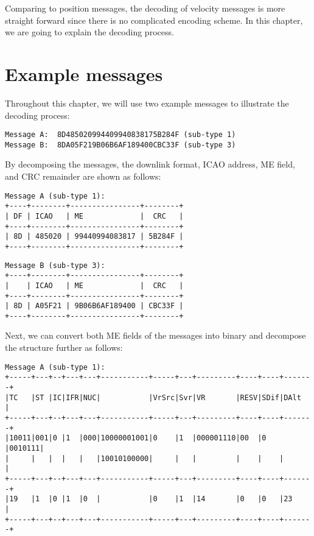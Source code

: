 Comparing to position messages, the decoding of velocity messages is more straight forward since there is no complicated encoding scheme. In this chapter, we are going to explain the decoding process.

\section{Example messages}

Throughout this chapter, we will use two example messages to illustrate the decoding process:

\begin{verbatim}
Message A:  8D485020994409940838175B284F (sub-type 1)
Message B:  8DA05F219B06B6AF189400CBC33F (sub-type 3)
\end{verbatim}

By decomposing the messages, the downlink format, ICAO address, ME field, and CRC remainder are shown as follows:

\begin{verbatim}
Message A (sub-type 1):
+----+--------+----------------+--------+
| DF | ICAO   | ME             |  CRC   |
+----+--------+----------------+--------+
| 8D | 485020 | 99440994083817 | 5B284F |
+----+--------+----------------+--------+
\end{verbatim}

\begin{verbatim}
Message B (sub-type 3):
+----+--------+----------------+--------+
|    | ICAO   | ME             |  CRC   |
+----+--------+----------------+--------+
| 8D | A05F21 | 9B06B6AF189400 | CBC33F |
+----+--------+----------------+--------+
\end{verbatim}

Next, we can convert both ME fields of the messages into binary and decompose the structure further as follows:

\begin{verbatim}
Message A (sub-type 1):
+-----+---+--+---+---+-----------+-----+---+---------+----+----+-------+
|TC   |ST |IC|IFR|NUC|           |VrSrc|Svr|VR       |RESV|SDif|DAlt   |
+-----+---+--+---+---+-----------+-----+---+---------+----+----+-------+
|10011|001|0 |1  |000|10000001001|0    |1  |000001110|00  |0   |0010111|
|     |   |  |   |   |10010100000|     |   |         |    |    |       |
+-----+---+--+---+---+-----------+-----+---+---------+----+----+-------+
|19   |1  |0 |1  |0  |           |0    |1  |14       |0   |0   |23     |
+-----+---+--+---+---+-----------+-----+---+---------+----+----+-------+
\end{verbatim}

